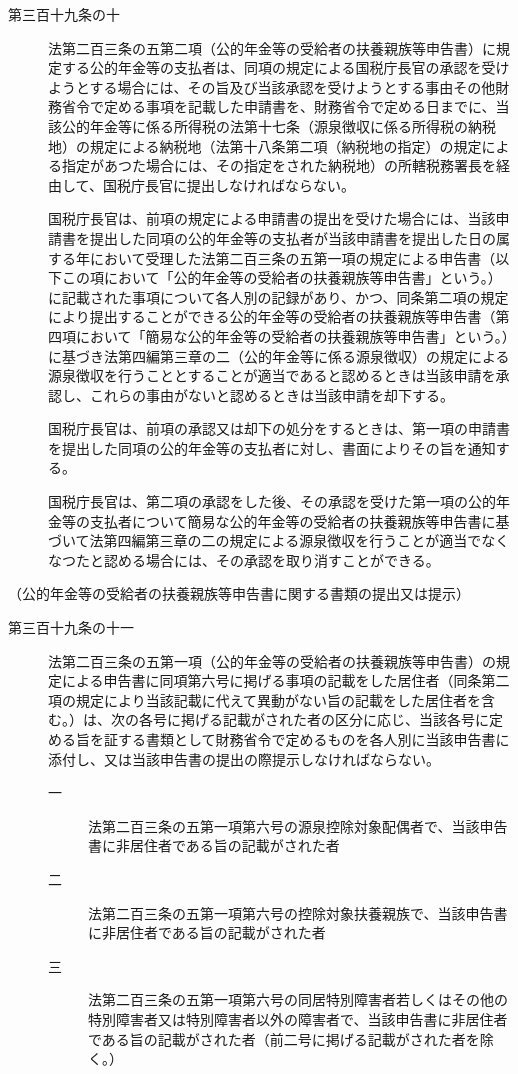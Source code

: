 \documentclass[twocolumn,a4j,10pt]{ltjtarticle}
\begin{document}
\begin{description}
\item[第三百十九条の十]法第二百三条の五第二項（公的年金等の受給者の扶養親族等申告書）に規定する公的年金等の支払者は、同項の規定による国税庁長官の承認を受けようとする場合には、その旨及び当該承認を受けようとする事由その他財務省令で定める事項を記載した申請書を、財務省令で定める日までに、当該公的年金等に係る所得税の法第十七条（源泉徴収に係る所得税の納税地）の規定による納税地（法第十八条第二項（納税地の指定）の規定による指定があつた場合には、その指定をされた納税地）の所轄税務署長を経由して、国税庁長官に提出しなければならない。
\item[]国税庁長官は、前項の規定による申請書の提出を受けた場合には、当該申請書を提出した同項の公的年金等の支払者が当該申請書を提出した日の属する年において受理した法第二百三条の五第一項の規定による申告書（以下この項において「公的年金等の受給者の扶養親族等申告書」という。）に記載された事項について各人別の記録があり、かつ、同条第二項の規定により提出することができる公的年金等の受給者の扶養親族等申告書（第四項において「簡易な公的年金等の受給者の扶養親族等申告書」という。）に基づき法第四編第三章の二（公的年金等に係る源泉徴収）の規定による源泉徴収を行うこととすることが適当であると認めるときは当該申請を承認し、これらの事由がないと認めるときは当該申請を却下する。
\item[]国税庁長官は、前項の承認又は却下の処分をするときは、第一項の申請書を提出した同項の公的年金等の支払者に対し、書面によりその旨を通知する。
\item[]国税庁長官は、第二項の承認をした後、その承認を受けた第一項の公的年金等の支払者について簡易な公的年金等の受給者の扶養親族等申告書に基づいて法第四編第三章の二の規定による源泉徴収を行うことが適当でなくなつたと認める場合には、その承認を取り消すことができる。
\end{description}
\noindent\hspace{10pt}（公的年金等の受給者の扶養親族等申告書に関する書類の提出又は提示）
\begin{description}
\item[第三百十九条の十一]法第二百三条の五第一項（公的年金等の受給者の扶養親族等申告書）の規定による申告書に同項第六号に掲げる事項の記載をした居住者（同条第二項の規定により当該記載に代えて異動がない旨の記載をした居住者を含む。）は、次の各号に掲げる記載がされた者の区分に応じ、当該各号に定める旨を証する書類として財務省令で定めるものを各人別に当該申告書に添付し、又は当該申告書の提出の際提示しなければならない。
\begin{description}
\item[一]法第二百三条の五第一項第六号の源泉控除対象配偶者で、当該申告書に非居住者である旨の記載がされた者
\item[二]法第二百三条の五第一項第六号の控除対象扶養親族で、当該申告書に非居住者である旨の記載がされた者
\item[三]法第二百三条の五第一項第六号の同居特別障害者若しくはその他の特別障害者又は特別障害者以外の障害者で、当該申告書に非居住者である旨の記載がされた者（前二号に掲げる記載がされた者を除く。）
\end{description}
\end{description}
\end{document}

